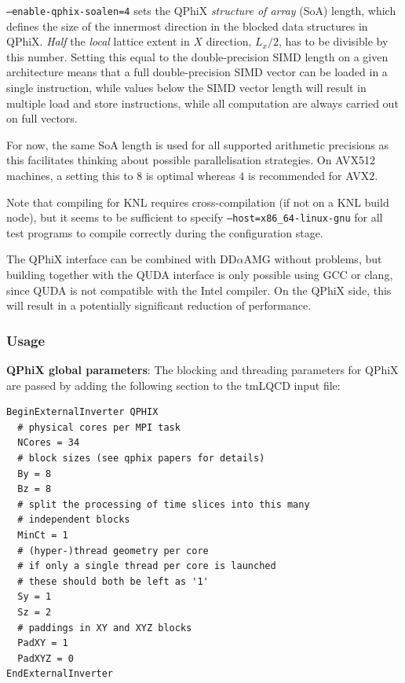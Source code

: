 \texttt{--enable-qphix-soalen=4} sets the QPhiX \emph{structure of array} (SoA) length, which defines the size of the innermost direction in the blocked data structures in QPhiX.
\emph{Half} the \emph{local} lattice extent in $X$ direction, $L_x/2$, has to be divisible by this number.
Setting this equal to the double-precision SIMD length on a given architecture means that a full double-precision SIMD vector can be loaded in a single instruction, while values below the SIMD vector length will result in multiple load and store instructions, while all computation are always carried out on full vectors.

For now, the same SoA length is used for all supported arithmetic precisions as this facilitates thinking about possible parallelisation strategies.
On AVX512 machines, a setting this to $8$ is optimal whereas $4$ is recommended for AVX2.

Note that compiling for KNL requires cross-compilation (if not on a KNL build node), but it seems to be sufficient to specify \texttt{--host=x86\_64-linux-gnu} for all test programs to compile correctly during the configuration stage. 

The QPhiX interface can be combined with DD$\alpha$AMG without problems, but building together with the QUDA interface is only possible using GCC or clang, since QUDA is not compatible with the Intel compiler.
On the QPhiX side, this will result in a potentially significant reduction of performance.

\subsubsection{Usage}

\noindent\textbf{QPhiX global parameters}: The blocking and threading parameters for QPhiX are passed by adding the following section to the tmLQCD input file:
\begin{framed}
\begin{Verbatim}
BeginExternalInverter QPHIX
  # physical cores per MPI task
  NCores = 34
  # block sizes (see qphix papers for details)
  By = 8
  Bz = 8
  # split the processing of time slices into this many
  # independent blocks
  MinCt = 1
  # (hyper-)thread geometry per core
  # if only a single thread per core is launched
  # these should both be left as '1'
  Sy = 1
  Sz = 2
  # paddings in XY and XYZ blocks
  PadXY = 1
  PadXYZ = 0
EndExternalInverter    
\end{Verbatim}
\end{framed}

